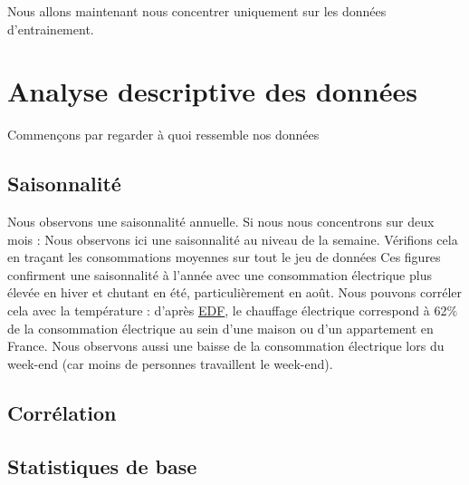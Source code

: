 \documentclass{article}
\begin{document}
Nous allons maintenant nous concentrer uniquement sur les données d'entrainement.
\section{Analyse descriptive des données}
Commençons par regarder à quoi ressemble nos données
\subsection{Saisonnalité}
Nous observons une saisonnalité annuelle. Si nous nous concentrons sur deux mois :
Nous observons ici une saisonnalité au niveau de la semaine. Vérifions cela en traçant les consommations moyennes sur tout le jeu de données
Ces figures confirment une saisonnalité à l'année avec une consommation électrique plus élevée en hiver et chutant en été, particulièrement en août. Nous pouvons corréler cela avec la température : d'après \href{https://travaux.edf.fr/electricite/raccordement/repartition-de-la-consommation-d-electricite-au-sein-d-un-foyer-francais}{EDF}, le chauffage électrique correspond à 62$\%$ de la consommation électrique au sein d'une maison ou d'un appartement en France. Nous observons aussi une baisse de la consommation électrique lors du week-end (car moins de personnes travaillent le week-end).

\subsection{Corrélation}

\subsection{Statistiques de base}
\end{document}
